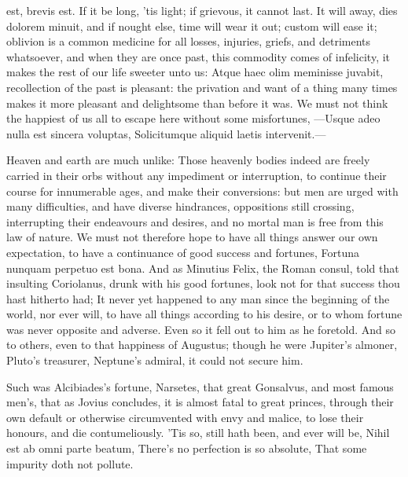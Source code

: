 {est, brevis est. If it be long, 'tis light; if grievous, it cannot
last. It will away, dies dolorem minuit, and if nought else, time will
wear it out; custom will ease it;  oblivion is a common medicine
for all losses, injuries, griefs, and detriments whatsoever, and
when they are once past, this commodity comes of infelicity, it makes
the rest of our life sweeter unto us:  Atque haec olim meminisse
juvabit, recollection of the past is pleasant: the privation and want
of a thing many times makes it more pleasant and delightsome than
before it was. We must not think the happiest of us all to escape here
without some misfortunes,
---Usque adeo nulla est sincera voluptas,
Solicitumque aliquid laetis intervenit.---

Heaven and earth are much unlike: Those heavenly bodies indeed
are freely carried in their orbs without any impediment or
interruption, to continue their course for innumerable ages, and make
their conversions: but men are urged with many difficulties, and have
diverse hindrances, oppositions still crossing, interrupting their
endeavours and desires, and no mortal man is free from this law of
nature. We must not therefore hope to have all things answer our own
expectation, to have a continuance of good success and fortunes,
Fortuna nunquam perpetuo est bona. And as Minutius Felix, the Roman
consul, told that insulting Coriolanus, drunk with his good fortunes,
look not for that success thou hast hitherto had; It never yet
happened to any man since the beginning of the world, nor ever will, to
have all things according to his desire, or to whom fortune was never
opposite and adverse. Even so it fell out to him as he foretold. And so
to others, even to that happiness of Augustus; though he were Jupiter's
almoner, Pluto's treasurer, Neptune's admiral, it could not secure him.

Such was Alcibiades's fortune, Narsetes, that great Gonsalvus, and most
famous men's, that as Jovius concludes, it is almost fatal to
great princes, through their own default or otherwise circumvented with
envy and malice, to lose their honours, and die contumeliously. 'Tis
so, still hath been, and ever will be, Nihil est ab omni parte beatum,
There's no perfection is so absolute,
That some impurity doth not pollute.

}
